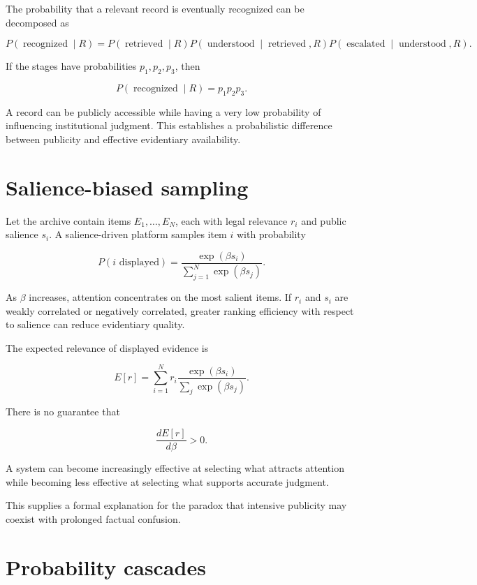 The probability that a relevant record is eventually recognized can be decomposed as

\[
P(\operatorname{recognized}\mid R)
=
P(\operatorname{retrieved}\mid R)
P(\operatorname{understood}\mid \operatorname{retrieved},R)
P(\operatorname{escalated}\mid \operatorname{understood},R).
\]

If the stages have probabilities \(p_1,p_2,p_3\), then

\[
P(\operatorname{recognized}\mid R)=p_1p_2p_3.
\]

A record can be publicly accessible while having a very low probability of influencing institutional judgment. This establishes a probabilistic difference between publicity and effective evidentiary availability.

\section{Salience-biased sampling}
\label{sec:a29}

Let the archive contain items \(E_1,\ldots,E_N\), each with legal relevance \(r_i\) and public salience \(s_i\). A salience-driven platform samples item \(i\) with probability

\[
P(i\text{ displayed})
=
\frac{\exp(\beta s_i)}
{\sum_{j=1}^{N}\exp(\beta s_j)}.
\]

As \(\beta\) increases, attention concentrates on the most salient items. If \(r_i\) and \(s_i\) are weakly correlated or negatively correlated, greater ranking efficiency with respect to salience can reduce evidentiary quality.

The expected relevance of displayed evidence is

\[
E[r]
=
\sum_{i=1}^{N}
r_i
\frac{\exp(\beta s_i)}
{\sum_j\exp(\beta s_j)}.
\]

There is no guarantee that

\[
\frac{dE[r]}{d\beta}>0.
\]

A system can become increasingly effective at selecting what attracts attention while becoming less effective at selecting what supports accurate judgment.

This supplies a formal explanation for the paradox that intensive publicity may coexist with prolonged factual confusion.

\section{Probability cascades}
\label{sec:a30}


